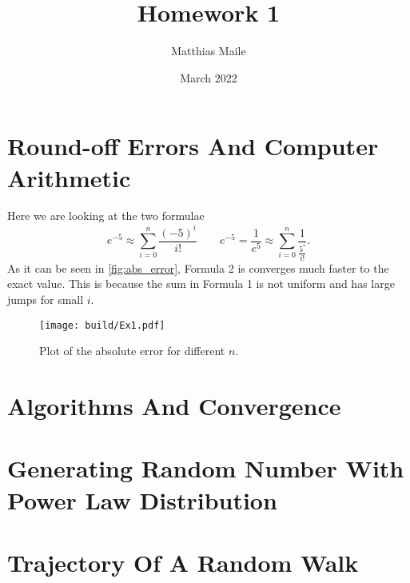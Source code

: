 \documentclass{article}
\author{Matthias Maile}
\date{March 2022}
\title{Homework 1}
\begin{document}
\maketitle
\tableofcontents

\section{Round-off Errors And Computer Arithmetic}
\label{sec:Round-off errors and Computer Arithmetic}
Here we are looking at the two formulae
\[
  e^{-5} \approx \sum_{i=0}^n \frac{(-5)^i}{i!}
  \qquad
  e^{-5} = \frac{1}{e^5} \approx \sum_{i=0}^n \frac{1}{\frac{5^i}{i!}}.
\]
As it can be seen in \autoref{fig:abs_error}, Formula 2 is converges much faster 
to the exact value. This is because the sum in Formula 1 is not uniform and has 
large jumps for small $i$.


\begin{figure}[H]
	\centering
	\texttt{[image: build/Ex1.pdf]}
	\caption{Plot of the absolute error for different $n$.}
	\label{fig:abs_error}
\end{figure}

\section{Algorithms And Convergence}
\label{sec:Algorithms and Convergence}

\section{Generating Random Number With Power Law Distribution}
\label{sec:Generating Random Number With Power Law Distribution}

\section{Trajectory Of A Random Walk}
\label{sec:Trajectory Of A Random Walk}
\end{document}
